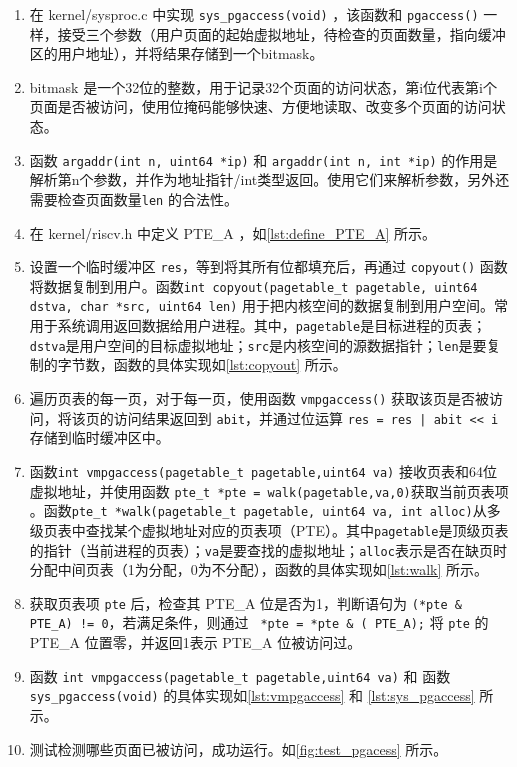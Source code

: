 {\begin{enumerate}
	\item 在 kernel/sysproc.c 中实现 \texttt{sys\_pgaccess(void)} ，该函数和 \texttt{pgaccess()} 一样，接受三个参数（用户页面的起始虚拟地址，待检查的页面数量，指向缓冲区的用户地址），并将结果存储到一个bitmask。
	\item bitmask 是一个32位的整数，用于记录32个页面的访问状态，第i位代表第i个页面是否被访问，使用位掩码能够快速、方便地读取、改变多个页面的访问状态。
	\item 函数 \texttt{argaddr(int n, uint64 *ip)} 和 \texttt{argaddr(int n, int *ip)} 的作用是解析第n个参数，并作为地址指针/int类型返回。使用它们来解析参数，另外还需要检查页面数量\texttt{len} 的合法性。
	\item 在 kernel/riscv.h 中定义 PTE\_A ，如\cref{lst:define_PTE_A} 所示。
	\item 设置一个临时缓冲区 \texttt{res}，等到将其所有位都填充后，再通过 \texttt{copyout()} 函数将数据复制到用户。函数\texttt{int copyout(pagetable\_t pagetable, uint64 dstva, char *src, uint64 len)} 用于把内核空间的数据复制到用户空间。常用于系统调用返回数据给用户进程。其中，\texttt{pagetable}是目标进程的页表；\texttt{dstva}是用户空间的目标虚拟地址；\texttt{src}是内核空间的源数据指针；\texttt{len}是要复制的字节数，函数的具体实现如\cref{lst:copyout} 所示。
	\item 遍历页表的每一页，对于每一页，使用函数 \texttt{vmpgaccess()} 获取该页是否被访问，将该页的访问结果返回到 \texttt{abit}，并通过位运算 \texttt{res = res | abit << i} 存储到临时缓冲区中。
    \item 函数\texttt{int vmpgaccess(pagetable\_t pagetable,uint64 va)} 接收页表和64位虚拟地址，并使用函数 \texttt{pte\_t *pte = walk(pagetable,va,0)}获取当前页表项 。函数\texttt{pte\_t *walk(pagetable\_t pagetable, uint64 va, int alloc)}从多级页表中查找某个虚拟地址对应的页表项（PTE）。其中\texttt{pagetable}是顶级页表的指针（当前进程的页表）；\texttt{va}是要查找的虚拟地址；\texttt{alloc}表示是否在缺页时分配中间页表（1为分配，0为不分配），函数的具体实现如\cref{lst:walk} 所示。
    \item 获取页表项 \texttt{pte} 后，检查其 PTE\_A 位是否为1，判断语句为 \texttt{(*pte \& PTE\_A) != 0}，若满足条件，则通过 \texttt{ *pte = *pte \& (~PTE\_A);} 将 \texttt{pte} 的 PTE\_A 位置零，并返回1表示 PTE\_A 位被访问过。
    \item 函数 \texttt{int vmpgaccess(pagetable\_t pagetable,uint64 va)} 和 函数 \texttt{sys\_pgaccess(void)} 的具体实现如\cref{lst:vmpgaccess} 和 \cref{lst:sys_pgaccess} 所示。
	\item 测试检测哪些页面已被访问，成功运行。如\cref{fig:test_pgacess} 所示。
\end{enumerate}

}
